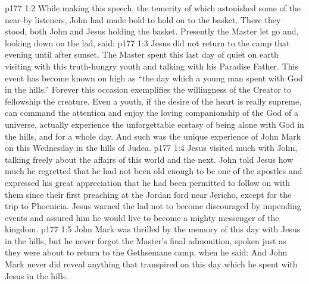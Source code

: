 \vs p177 1:2 While making this speech, the temerity of which astonished some of the near\hyp{}by listeners, John had made bold to hold on to the basket. There they stood, both John and Jesus holding the basket. Presently the Master let go and, looking down on the lad, said: 
\vs p177 1:3 Jesus did not return to the camp that evening until after sunset. The Master spent this last day of quiet on earth visiting with this truth\hyp{}hungry youth and talking with his Paradise Father. This event has become known on high as “the day which a young man spent with God in the hills.” Forever this occasion exemplifies the willingness of the Creator to fellowship the creature. Even a youth, if the desire of the heart is really supreme, can command the attention and enjoy the loving companionship of the God of a universe, actually experience the unforgettable ecstasy of being alone with God in the hills, and for a whole day. And such was the unique experience of John Mark on this Wednesday in the hills of Judea.
\vs p177 1:4 Jesus visited much with John, talking freely about the affairs of this world and the next. John told Jesus how much he regretted that he had not been old enough to be one of the apostles and expressed his great appreciation that he had been permitted to follow on with them since their first preaching at the Jordan ford near Jericho, except for the trip to Phoenicia. Jesus warned the lad not to become discouraged by impending events and assured him he would live to become a mighty messenger of the kingdom.
\vs p177 1:5 John Mark was thrilled by the memory of this day with Jesus in the hills, but he never forgot the Master’s final admonition, spoken just as they were about to return to the Gethsemane camp, when he said:  And John Mark never did reveal anything that transpired on this day which he spent with Jesus in the hills.
